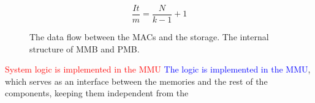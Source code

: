 \documentclass[conference,compsoc]{IEEEtran}
\begin{document}
\begin{equation}\label{niter}
  \frac{It}{m} = \frac{N}{k-1} + 1
\end{equation}

\begin{figure}[!t]
\centering
{}
\hfil
\centering
{}
\caption{\protect{} The data flow between the MACs and the
  storage. \protect{} The internal structure of MMB and PMB.}
\label{muxes}
\end{figure}
\textcolor{red}{System logic is implemented in the MMU}
\textcolor{blue}{The logic is implemented in the MMU}, which serves as an interface between the
memories and the rest of the components, keeping them independent from the
\end{document}
